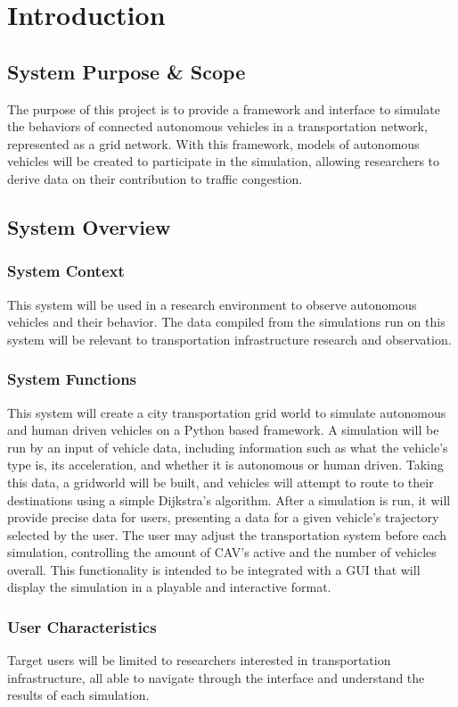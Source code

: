 \documentclass[onecolumn, draftclsnofoot,10pt, compsoc]{IEEEtran}
\begin{document}
\section{Introduction}
\subsection{System Purpose \& Scope}
The purpose of this project is to provide a framework and interface to simulate the behaviors of connected autonomous vehicles in a transportation network, represented as a grid network.
With this framework, models of autonomous vehicles will be created to participate in the simulation, allowing researchers to derive data on their contribution to traffic congestion.
\subsection{System Overview}
\subsubsection{System Context}
This system will be used in a research environment to observe autonomous vehicles and their behavior.
The data compiled from the simulations run on this system will be relevant to transportation infrastructure research and observation.
\subsubsection{System Functions}
This system will create a city transportation grid world to simulate autonomous and human driven vehicles on a Python based framework.
A simulation will be run by an input of vehicle data, including information such as what the vehicle’s type is, its acceleration, and whether it is autonomous or human driven.
Taking this data, a gridworld will be built, and vehicles will attempt to route to their destinations using a simple Dijkstra’s algorithm.
After a simulation is run, it will provide precise data for users, presenting a data for a given vehicle’s trajectory selected by the user.
The user may adjust the transportation system before each simulation, controlling the amount of CAV’s active and the number of vehicles overall.
This functionality is intended to be integrated with a GUI that will display the simulation in a playable and interactive format.
\subsubsection{User Characteristics}
Target users will be limited to researchers interested in transportation infrastructure, all able to navigate through the interface and understand the results of each simulation.
\end{document}
